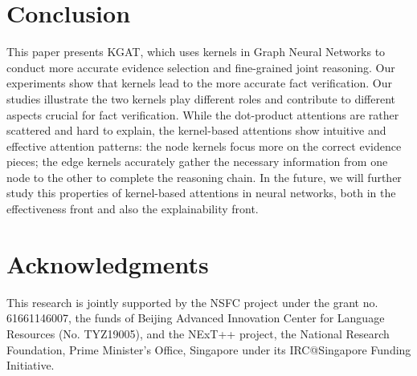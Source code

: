 \documentclass[11pt,a4paper]{article}
\begin{document}
\section{Conclusion}
This paper presents KGAT, which uses kernels in Graph Neural Networks to conduct more accurate evidence selection and fine-grained joint reasoning.
Our experiments show that kernels lead to the more accurate fact verification.
Our studies illustrate the two kernels play different roles and contribute to different aspects crucial for fact verification.
While the dot-product attentions are rather scattered and hard to explain, the kernel-based attentions show intuitive and effective attention patterns: the node kernels focus more on the correct evidence pieces; the edge kernels accurately gather the necessary information from one node to the other to complete the reasoning chain.
In the future, we will further study this properties of kernel-based attentions in neural networks, both in the effectiveness front and also the explainability front.

\section*{Acknowledgments}
This research is jointly supported by the NSFC project under the grant no. 61661146007, the funds of Beijing Advanced Innovation Center for Language Resources (No. TYZ19005), and the NExT++ project, the National Research Foundation, Prime Minister’s Office, Singapore under its IRC@Singapore Funding Initiative.
\end{document}
